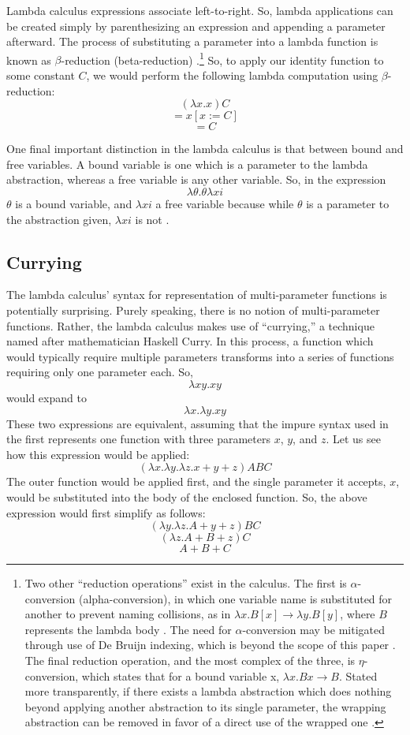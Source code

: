\documentclass[twocolumn,titlepage,12pt]{article}
\begin{document}
Lambda calculus expressions associate left-to-right. So, lambda applications can be created simply by parenthesizing an expression and appending a parameter afterward. The process of substituting a parameter into a lambda function is known as $\beta$-reduction (beta-reduction) \cite{hudakintro}.\footnote{Two other ``reduction operations'' exist in the calculus. The first is $\alpha$-conversion (alpha-conversion), in which one variable name is substituted for another to prevent naming collisions, as in $\lambda x.B[x] \to \lambda y.B[y]$, where $B$ represents the lambda body \cite{hudakintro}. The need for $\alpha$-conversion may be mitigated through use of De Bruijn indexing, which is beyond the scope of this paper \cite{debruijn}. The final reduction operation, and the most complex of the three, is $\eta$-conversion, which states that for a bound variable x, $\lambda x.Bx \to B$. Stated more transparently, if there exists a lambda abstraction which does nothing beyond applying another abstraction to its single parameter, the wrapping abstraction can be removed in favor of a direct use of the wrapped one \cite{etared}.} So, to apply our identity function to some constant $C$, we would perform the following lambda computation using $\beta$-reduction:
$$(\lambda x.x)C$$
$$=x[x:=C]$$
$$=C$$

One final important distinction in the lambda calculus is that between bound and free variables. A bound variable is one which is a parameter to the lambda abstraction, whereas a free variable is any other variable. So, in the expression
$$\lambda \theta.\theta \lambda xi$$
$\theta$ is a bound variable, and $\lambda xi$ a free variable because while $\theta$ is a parameter to the abstraction given, $\lambda xi$ is not \cite{stanfordlc}.

\subsection{Currying}
The lambda calculus' syntax for representation of multi-parameter functions is potentially surprising. Purely speaking, there is no notion of multi-parameter functions. Rather, the lambda calculus makes use of ``currying,'' a technique named after mathematician Haskell Curry. In this process, a function which would typically require multiple parameters transforms into a series of functions requiring only one parameter each. So,
$$\lambda xy.xy$$
would expand to
$$\lambda x.\lambda y.xy$$
These two expressions are equivalent, assuming that the impure syntax used in the first represents one function with three parameters $x$, $y$, and $z$. Let us see how this expression would be applied:
$$(\lambda x.\lambda y.\lambda z.x+y+z)ABC$$
The outer function would be applied first, and the single parameter it accepts, $x$, would be substituted into the body of the enclosed function. So, the above expression would first simplify as follows:
$$(\lambda y.\lambda z.A+y+z)BC$$
$$(\lambda z.A+B+z)C$$
$$A+B+C$$
\end{document}
